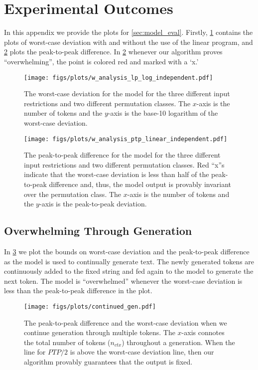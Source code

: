 \section{Experimental Outcomes}
\label{sec:appOut}
In this appendix we provide the plots for \cref{sec:model_eval}.
Firstly, \cref{fig:worst-case} contains the plots of worst-case deviation with and without the use of the linear program, and  \cref{fig:ptp} plots the peak-to-peak difference. In \cref{fig:ptp} whenever our algorithm proves ``overwhelming'', the point is colored red and marked with a `x.'
\vspace{0pt}\nopagebreak
\begin{figure}[H]
    \centering
	\texttt{[image: figs/plots/w\_analysis\_lp\_log\_independent.pdf]}
	\caption{The worst-case deviation for the model for the three different input restrictions and two different permutation classes.
    The $x$-axis is the number of tokens and the $y$-axis is the base-10 logarithm of the worst-case deviation.
    }
	\label{fig:worst-case}
\end{figure}
\pagebreak
\begin{figure}[H]
    \centering
	\texttt{[image: figs/plots/w\_analysis\_ptp\_linear\_independent.pdf]}
	\caption{The peak-to-peak difference for the model for the three different input restrictions and two different permutation classes.
	Red ``x''s indicate that the worst-case deviation is less than half of the peak-to-peak difference and, thus, the model output is provably invariant over the permutation class.
        The $x$-axis is the number of tokens and the $y$-axis is the peak-to-peak deviation.
    }
	\label{fig:ptp}
\end{figure}

\subsection*{Overwhelming Through Generation}
In \cref{fig:contOverwhelm} we plot the bounds on worst-case deviation and the peak-to-peak difference as the model is used to continually generate text. The newly generated tokens are continuously added to the fixed string and fed again to the model to generate the next token. The model is ``overwhelmed'' whenever the worst-case deviation is less than the peak-to-peak difference in the plot.

\vspace{0pt}\nopagebreak
\begin{figure}[H]
    \centering
	\texttt{[image: figs/plots/continued\_gen.pdf]}
	\caption{
            The peak-to-peak difference and the worst-case deviation when we continue generation through multiple tokens.
            The $x$-axis connotes the total number of tokens ($n_{ctx}$) throughout a generation.
            When the line for $PTP / 2$ is above the worst-case deviation line, then our algorithm provably guarantees that the output is fixed.}
	\label{fig:contOverwhelm}
\end{figure}
